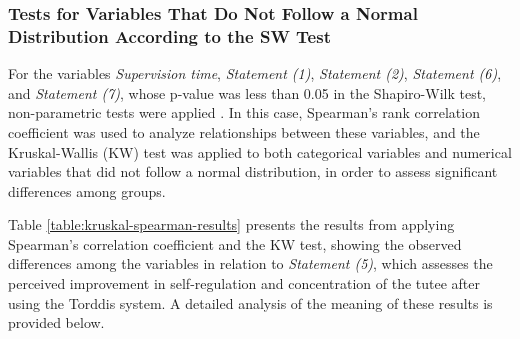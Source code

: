                 \subsubsection{Tests for Variables That Do Not Follow a Normal Distribution According to the SW Test}
                For the variables \textit{Supervision time}, \textit{Statement (1)}, \textit{Statement (2)}, \textit{Statement (6)}, and \textit{Statement (7)}, whose p-value was less than 0.05 in the Shapiro-Wilk test, non-parametric tests were applied \citep{Smeeton2025Applied}. In this case, Spearman’s rank correlation coefficient \citep{Yu2024Robust} was used to analyze relationships between these variables, and the Kruskal-Wallis (KW) test \citep{Jamil2024Influence} was applied to both categorical variables and numerical variables that did not follow a normal distribution, in order to assess significant differences among groups.
                
                Table \ref{table:kruskal-spearman-results} presents the results from applying Spearman’s correlation coefficient and the KW test, showing the observed differences among the variables in relation to \textit{Statement (5)}, which assesses the perceived improvement in self-regulation and concentration of the tutee after using the Torddis system. A detailed analysis of the meaning of these results is provided below.
                
